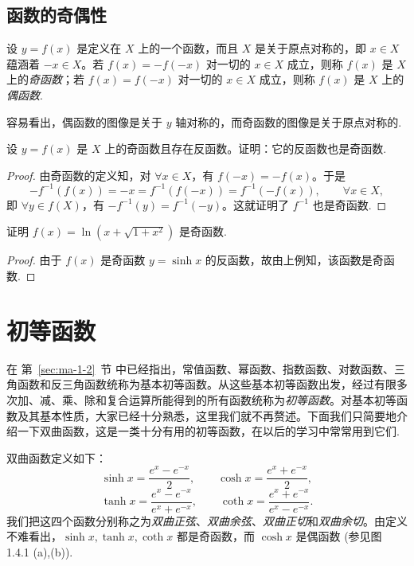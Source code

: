 \subsection{函数的奇偶性}
\label{subsec:ma-1-3-4}

设 $y=f(x)$ 是定义在 $X$ 上的一个函数，而且 $X$ 是关于原点对称的，即 $x\in X$ 蕴涵着 $-x\in X$。若 $f(x)=-f(-x)$ 对一切的 $x\in X$ 成立，则称 $f(x)$ 是 $X$ 上的\emph{奇函数}；若 $f(x)=f(-x)$ 对一切的 $x\in X$ 成立，则称 $f(x)$ 是 $X$ 上的\emph{偶函数}.

容易看出，偶函数的图像是关于 $y$ 轴对称的，而奇函数的图像是关于原点对称的.

\begin{example}\label{example:ma-1-3-8}
设 $y=f(x)$ 是 $X$ 上的奇函数且存在反函数。证明：它的反函数也是奇函数.
\end{example}


\begin{proof}
由奇函数的定义知，对 $\forall x\in X$，有 $f(-x)=-f(x)$。于是
\[
  -f^{-1}(f(x))=-x=f^{-1}(f(-x))=f^{-1}(-f(x)),\qquad \forall x\in X,
\]
即 $\forall y\in f(X)$，有 $-f^{-1}(y)=f^{-1}(-y)$。这就证明了 $f^{-1}$ 也是奇函数.
\end{proof}


\begin{example}\label{example:ma-1-3-9}
证明 $f(x)=\ln(x+\sqrt{1+x^2})$ 是奇函数.
\end{example}


\begin{proof}
由于 $f(x)$ 是奇函数 $y=\sinh x$ 的反函数，故由上例知，该函数是奇函数.
\end{proof}


\section{初等函数}
\label{sec:ma-1-4}

在 第~\ref{sec:ma-1-2}~节 中已经指出，常值函数、幂函数、指数函数、对数函数、三角函数和反三角函数统称为基本初等函数。从这些基本初等函数出发，经过有限多次加、减、乘、除和复合运算所能得到的所有函数统称为\emph{初等函数}。对基本初等函数及其基本性质，大家已经十分熟悉，这里我们就不再赘述。下面我们只简要地介绍一下双曲函数，这是一类十分有用的初等函数，在以后的学习中常常用到它们.

双曲函数定义如下：
\[
  \sinh x=\frac{e^x-e^{-x}}{2},\qquad
  \cosh x=\frac{e^x+e^{-x}}{2},
\]
\[
  \tanh x=\frac{e^x-e^{-x}}{e^x+e^{-x}},\qquad
  \coth x=\frac{e^x+e^{-x}}{e^x-e^{-x}}.
\]
我们把这四个函数分别称之为\emph{双曲正弦}、\emph{双曲余弦}、\emph{双曲正切}和\emph{双曲余切}。由定义不难看出，$\sinh x,\tanh x,\coth x$ 都是奇函数，而 $\cosh x$ 是偶函数 (参见图 1.4.1 (a),(b)).

